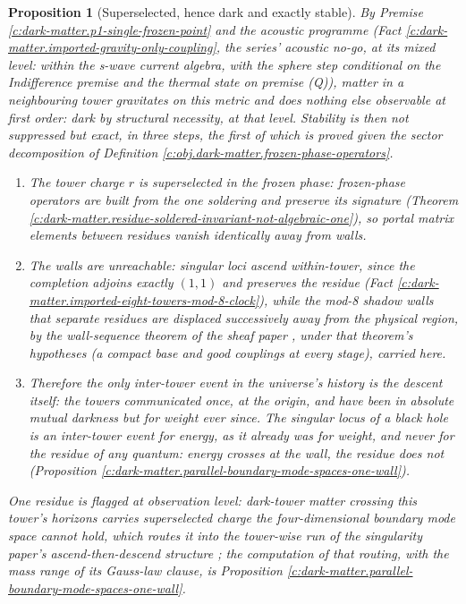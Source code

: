 \documentclass[11pt]{article}
\newtheorem{proposition}[theorem]{Proposition}
\theoremstyle{definition}
\theoremstyle{plain}
\newcommand{\changedmark}[2]{\marginpar{\raggedright\scriptsize\color{#1}#2}}
\begin{document}
\begin{proposition}[Superselected, hence dark and exactly stable]\label{c:dark-matter.superselected-hence-dark-exactly-stable}
\changedmark{BrickRed}{corrected since the deposit}
By Premise \ref{c:dark-matter.p1-single-frozen-point} and the acoustic programme (Fact \ref{c:dark-matter.imported-gravity-only-coupling}, the series' acoustic no-go, at its mixed level: within the s-wave current algebra, with the sphere step conditional on the Indifference premise and the thermal state on premise (Q)), matter in a neighbouring tower gravitates on this metric and does nothing else observable at first order: dark by structural necessity, at that level. Stability is then not suppressed but exact, in three steps, the first of which is proved given the sector decomposition of Definition \ref{c:obj.dark-matter.frozen-phase-operators}.
\begin{enumerate}
\item The tower charge $r$ is superselected in the frozen phase: frozen-phase operators are built from the one soldering and preserve its signature (Theorem \ref{c:dark-matter.residue-soldered-invariant-not-algebraic-one}), so portal matrix elements between residues vanish identically away from walls.
\item The walls are unreachable: singular loci ascend within-tower, since the completion adjoins exactly $(1,1)$ and preserves the residue (Fact \ref{c:dark-matter.imported-eight-towers-mod-8-clock}), while the mod-8 shadow walls that separate residues are displaced successively away from the physical region, by the wall-sequence theorem of the sheaf paper \cite[\S5]{ButlerT4}, under that theorem's hypotheses (a compact base and good couplings at every stage), carried here.
\item Therefore the only inter-tower event in the universe's history is the descent itself: the towers communicated once, at the origin, and have been in absolute mutual darkness but for weight ever since. The singular locus of a black hole is an inter-tower event for energy, as it already was for weight, and never for the residue of any quantum: energy crosses at the wall, the residue does not (Proposition \ref{c:dark-matter.parallel-boundary-mode-spaces-one-wall}).
\end{enumerate}
One residue is flagged at observation level: dark-tower matter crossing this tower's horizons carries superselected charge the four-dimensional boundary mode space cannot hold, which routes it into the tower-wise run of the singularity paper's ascend-then-descend structure \cite{ButlerT5}; the computation of that routing, with the mass range of its Gauss-law clause, is Proposition \ref{c:dark-matter.parallel-boundary-mode-spaces-one-wall}.
\end{proposition}
\end{document}
